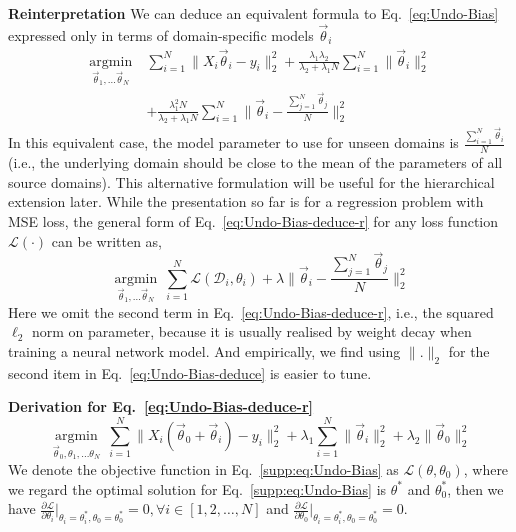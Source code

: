 \documentclass[runningheads]{llncs}
\newcommand{\keypoint}[1]{\vspace{0.1cm}\noindent\textbf{#1}\quad}
\begin{document}
\keypoint{Reinterpretation}
We can deduce an equivalent formula to Eq.~\ref{eq:Undo-Bias} expressed only in terms of domain-specific models $\vec{\theta}_i$
\small
\begin{equation}
\label{eq:Undo-Bias-deduce-r}
\begin{aligned}
\underset{\vec{\theta}_{1},\dots \vec{\theta}_{N}}{\operatorname{argmin}}~ &\sum_{i=1}^{N} \| \mathit{X}_{i}\vec{\theta}_{i} - y_{i}  \|_{2}^{2} + \frac{\lambda_{1}\lambda_{2}}{\lambda_{2} + \lambda_{1}N} \sum_{i=1}^{N} \|\vec{\theta}_{i} \|_{2}^{2} \\ 
& + \frac{{\lambda_{1}^{2}N}}{\lambda_{2} + \lambda_{1}N} \sum_{i=1}^{N} \| \vec{\theta}_{i} - \frac{\sum_{j=1}^{N}\vec{\theta}_{j}}{N}   \|_{2}^{2}
\end{aligned}
\end{equation}
\normalsize
In this equivalent case, the model parameter to use for unseen domains is $ \frac{\sum_{i=1}^{N}\vec{\theta}_{i}}{N}$ (i.e., the underlying domain should be close to the mean of the parameters of all source domains). This alternative formulation will be useful for the hierarchical extension later. While the presentation so far is for a regression problem with MSE loss, the general form of Eq.~\ref{eq:Undo-Bias-deduce-r} for any loss function $\mathcal{L}(\cdot)$ can be written as,
\small
\begin{equation}
\label{eq:Undo-Bias-deduce}
\underset{\vec{\theta}_{1},\dots \vec{\theta}_{N}}{\operatorname{argmin}}~ \sum_{i=1}^{N} \mathcal{L}(\mathcal{D}_i, {\theta}_{i}) + \lambda \|\vec{\theta}_{i} - \frac{\sum_{j=1}^{N}\vec{\theta}_{j}}{N} \|_{2}^{2}
\end{equation}
\normalsize
Here we omit the second term in Eq.~\ref{eq:Undo-Bias-deduce-r}, i.e., the squared $\ell_2$ norm on parameter, because it is usually realised by weight decay when training a neural network model. And empirically, we find using $\|.\|_{2}$ for the second item in Eq.~\ref{eq:Undo-Bias-deduce} is easier to tune.


\keypoint{Derivation for Eq.~\ref{eq:Undo-Bias-deduce-r} \label{appendix-deduction}}
\begin{equation}
\label{supp:eq:Undo-Bias}
\underset{\vec{\theta}_{0}, \theta_{1},\dots \theta_{N}}{\operatorname{argmin}}~ \sum_{i=1}^{N} \| \mathit{X}_{i}(\vec{\theta}_{0} + \mathit{\vec{\theta}_{i}}) - y_{i}  \|_{2}^{2} +\lambda_{1} \sum_{i=1}^{N} \|\mathit{\vec{\theta}_{i}} \|_{2}^{2} + \lambda_{2} \|\vec{\theta}_{0} \|_{2}^{2} 
\end{equation}
We denote the objective function in Eq.~\ref{supp:eq:Undo-Bias} as $\mathcal{L}(\theta, \theta_0)$, where we regard the optimal solution for Eq.~\ref{supp:eq:Undo-Bias} is $\theta^*$ and $\theta_0^*$, then we have $\frac{\partial \mathcal{L}}{\partial \theta_{i}} |_{\theta_{i}=\theta_i^*, \theta_0 = \theta_0^{*}} = 0, \forall i \in [1,2,\dots,N]$ and $\frac{\partial \mathcal{L}}{\partial \theta_{0}} |_{\theta_{i}=\theta_i^*, \theta_0 = \theta_0^{*}} = 0$.
\end{document}
